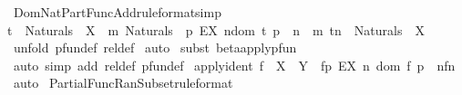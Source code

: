 \begin{isabellebody}
\isanewline
\isanewline
{}\isamarkupfalse%
\ Dom{\isacharunderscore}Nat{\isacharunderscore}Part{\isacharunderscore}Func{\isacharunderscore}Add{\isacharbrackleft}rule{\isacharunderscore}format{\isacharcomma}simp{\isacharbrackright}{\isacharcolon}\ \isanewline
{\isachardoublequoteopen}t\ {\isacharcolon}\ {\isacharparenleft}Naturals\ {\isacharminus}{\isacharbar}{\isacharminus}{\isachargreater}\ X{\isacharparenright}\ {\isacharminus}{\isacharminus}{\isachargreater}\ m{\isacharcolon}\ Naturals\ {\isacharminus}{\isacharminus}{\isachargreater}\ {\isacharbraceleft}p{\isachardot}\ EX\ n{\isacharcolon}dom\ t{\isachardot}\ p\ {\isacharequal}\ {\isacharparenleft}n\ {\isacharplus}\ m{\isacharcomma}\ t{\isacharpercent}{\isacharcircum}n{\isacharparenright}{\isacharbraceright}\ {\isacharcolon}\ {\isacharparenleft}Naturals\ {\isacharminus}{\isacharbar}{\isacharminus}{\isachargreater}\ X{\isacharparenright}{\isachardoublequoteclose}\isanewline
%
\isadelimproof
%
\endisadelimproof
%
\isatagproof
{}\isamarkupfalse%
\ {\isacharparenleft}unfold\ pfun{\isacharunderscore}def\ rel{\isacharunderscore}def{\isacharparenright}\isanewline
{}\isamarkupfalse%
\ auto\isanewline
{}\isamarkupfalse%
\ {\isacharparenleft}subst\ beta{\isacharunderscore}apply{\isacharunderscore}pfun{\isacharparenright}\isanewline
{}\isamarkupfalse%
\ {\isacharparenleft}auto\ simp\ add{\isacharcolon}\ rel{\isacharunderscore}def\ pfun{\isacharunderscore}def{\isacharparenright}\isanewline
{}\isamarkupfalse%
%
\endisatagproof
{\isafoldproof}%
%
\isadelimproof
\isanewline
%
\endisadelimproof
\isanewline
\isanewline
{}\isamarkupfalse%
\ apply{\isacharunderscore}ident{\isacharcolon}\ {\isachardoublequoteopen}f\ {\isacharcolon}\ {\isacharparenleft}X\ {\isacharminus}{\isacharbar}{\isacharminus}{\isachargreater}\ Y{\isacharparenright}\ {\isasymLongrightarrow}\ {\isacharparenleft}f{\isacharequal}{\isacharbraceleft}p{\isachardot}\ EX\ n{\isacharcolon}\ dom\ f{\isachardot}\ p\ {\isacharequal}\ {\isacharparenleft}n{\isacharcomma}f{\isacharpercent}{\isacharcircum}n{\isacharparenright}{\isacharbraceright}{\isacharparenright}{\isachardoublequoteclose}\isanewline
%
\isadelimproof
%
\endisadelimproof
%
\isatagproof
{}\isamarkupfalse%
\ auto\isanewline
{}\isamarkupfalse%
%
\endisatagproof
{\isafoldproof}%
%
\isadelimproof
\isanewline
%
\endisadelimproof
\isanewline
{}\isamarkupfalse%
\ Partial{\isacharunderscore}Func{\isacharunderscore}Ran{\isacharunderscore}Subset{\isacharbrackleft}rule{\isacharunderscore}format{\isacharbrackright}{\isacharcolon}\ \isanewline

\end{isabellebody}
